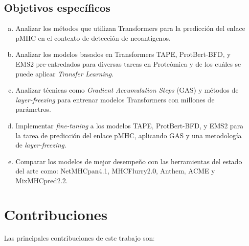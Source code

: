 \subsection{Objetivos específicos}

\begin{enumerate}[(a)]
	\item Analizar los métodos que utilizan Transformers para la predicción del enlace pMHC en el contexto de detección de neoantígenos.
	\item Analizar los modelos basados en Transformers TAPE, ProtBert-BFD, y EMS2 pre-entredados para diversas tareas en Proteómica y de los cuáles se puede aplicar \textit{Transfer Learning}. 
	\item Analizar técnicas como \textit{Gradient Accumulation Steps} (GAS) y métodos de \textit{layer-freezing} para entrenar modelos Transformers con millones de parámetros.
	\item Implementar \textit{fine-tuning} a los modelos TAPE, ProtBert-BFD, y EMS2 para la tarea de predicción del enlace pMHC, aplicando GAS y una metodología de \textit{layer-freezing}.
	\item Comparar los modelos de mejor desempeño con las herramientas del estado del arte como: NetMHCpan4.1, MHCFlurry2.0, Anthem, ACME y MixMHCpred2.2.
\end{enumerate}

\section{Contribuciones}
\label{sec:contribuciones}
Las principales contribuciones de este trabajo son:

